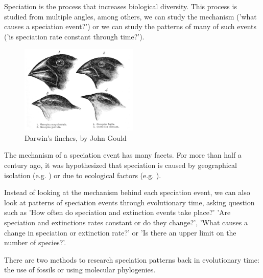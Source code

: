 Speciation is the process that increases biological diversity.
This process is studied from multiple angles, among others,
we can study the mechanism ('what
causes a speciation event?') or we can study the patterns of many
of such events ('is speciation rate constant through time?').

\begin{figure}[H]
  \includegraphics[width=0.5\textwidth]{Darwin's_finches_by_Gould.jpg}
  \caption{
    Darwin's finches, by John Gould
  }
\end{figure}

The mechanism of a speciation event has many facets.
For more than half a century ago, it was hypothesized
that speciation is caused by geographical 
isolation (e.g. \cite{mayr1942})
or due to ecological factors (e.g. \cite{lack1947}).

Instead of looking at the mechanism behind each speciation event,
we can also look at patterns of speciation events through evolutionary time,
asking question such as 'How often do speciation and extinction events take place?'
'Are speciation and extinctions rates constant or do they change?',
'What causes a change in speciation or extinction rate?' or
'Is there an upper limit on the number of species?'.

There are two methods to research speciation patterns back in evolutionary time:
the use of fossils or using molecular phylogenies.


